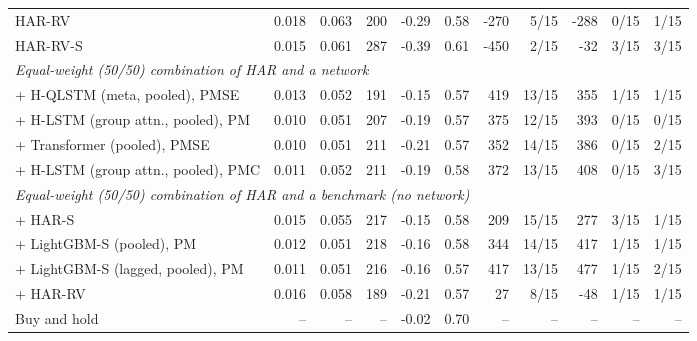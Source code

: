 \begin{tabular}{lrrrrrrrrrr}
HAR-RV & 0.018 & 0.063 & 200 & -0.29 & 0.58 & -270 & 5/15 & -288 & 0/15 & 1/15 \\
HAR-RV-S & 0.015 & 0.061 & 287 & -0.39 & 0.61 & -450 & 2/15 & -32 & 3/15 & 3/15 \\
\midrule
\multicolumn{11}{l}{\emph{Equal-weight (50/50) combination of HAR and a network}} \\
+ H-QLSTM (meta, pooled), PMSE & 0.013 & 0.052 & 191 & -0.15 & 0.57 & 419 & 13/15 & 355 & 1/15 & 1/15 \\
+ H-LSTM (group attn., pooled), PM & 0.010 & 0.051 & 207 & -0.19 & 0.57 & 375 & 12/15 & 393 & 0/15 & 0/15 \\
+ Transformer (pooled), PMSE & 0.010 & 0.051 & 211 & -0.21 & 0.57 & 352 & 14/15 & 386 & 0/15 & 2/15 \\
+ H-LSTM (group attn., pooled), PMC & 0.011 & 0.052 & 211 & -0.19 & 0.58 & 372 & 13/15 & 408 & 0/15 & 3/15 \\
\midrule
\multicolumn{11}{l}{\emph{Equal-weight (50/50) combination of HAR and a benchmark (no network)}} \\
+ HAR-S & 0.015 & 0.055 & 217 & -0.15 & 0.58 & 209 & 15/15 & 277 & 3/15 & 1/15 \\
+ LightGBM-S (pooled), PM & 0.012 & 0.051 & 218 & -0.16 & 0.58 & 344 & 14/15 & 417 & 1/15 & 1/15 \\
+ LightGBM-S (lagged, pooled), PM & 0.011 & 0.051 & 216 & -0.16 & 0.57 & 417 & 13/15 & 477 & 1/15 & 2/15 \\
+ HAR-RV & 0.016 & 0.058 & 189 & -0.21 & 0.57 & 27 & 8/15 & -48 & 1/15 & 1/15 \\
\midrule
Buy and hold & -- & -- & -- & -0.02 & 0.70 & -- & -- & -- & -- & -- \\
\bottomrule
\end{tabular}
